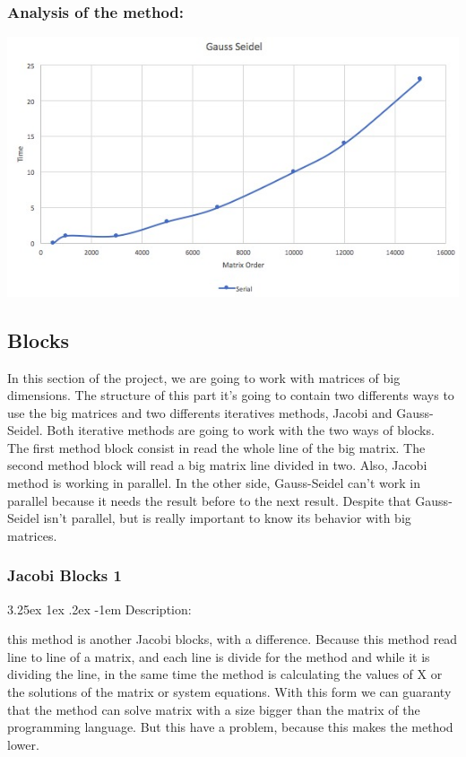 \documentclass{article}
\makeatletter
\renewcommand\paragraph{\@startsection{paragraph}{5}{\z@}%
  {3.25ex \@plus1ex \@minus.2ex}%
  {-1em}%
  {\normalfont\normalsize\bfseries}}
\makeatother
\begin{document}
\subsubsection{Analysis of the method:}


\includegraphics[width=\linewidth]{./images/gs.jpeg}\\

\subsection{Blocks}

In this section of the project, we are going to work with matrices of big dimensions. The structure of this part it's going to contain two differents ways to use the big matrices and two differents iteratives methods, Jacobi and Gauss-Seidel. Both iterative methods are going to work with the two ways of blocks. The first method block consist in read the whole line of the big matrix. The second method block will read a big matrix line divided in two. Also, Jacobi method is working in parallel. In the other side, Gauss-Seidel can't work in parallel because it needs the result before to the next result. Despite that Gauss-Seidel isn't parallel, but is really important to know its behavior with big matrices.

\subsubsection{Jacobi Blocks 1}


\paragraph{Description:}
\hfill \break

this method is another Jacobi blocks, with a difference. Because this method read line to line of a matrix, and each line is divide for the method and while it is dividing the line, in the same time the method is calculating the values of X or the solutions of the matrix or system equations. With this form we can guaranty that the method can solve matrix with a size bigger than the matrix of the programming language. But this have a problem, because this makes the method lower.
\end{document}
